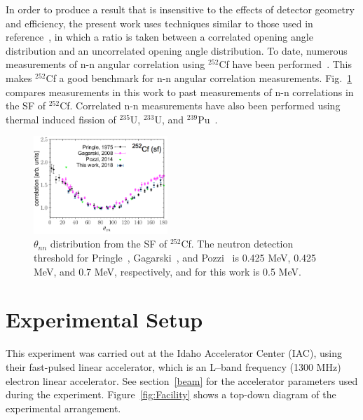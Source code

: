 \documentclass[%
 reprint,
 amsmath,amssymb,
 aps,
 nofootinbib
]{revtex4-1}
\begin{document}
In order to produce a result that is insensitive to the effects of detector geometry and efficiency, the present work uses techniques similar to those used in reference~\cite{1975Cf252}, in which a ratio is taken between a correlated opening angle distribution and an uncorrelated opening angle distribution.
To date, numerous measurements of n-n angular correlation using $^{252}$Cf have been performed~\cite{Verbeke2018, Pozzi2014, 2008CF252, 1975Cf252}.
This makes $^{252}$Cf a good benchmark for n-n angular correlation measurements.
Fig.~\ref{fig:Cf252_us_vs_them} compares measurements in this work to past measurements of n-n correlations in the SF of $^{252}$Cf.
Correlated n-n measurements have also been performed using thermal induced fission of $^{235}$U, $^{233}$U, and $^{239}$Pu~\cite{Sokolov2010}.
\begin{figure}[h]
\centering
\includegraphics[width=0.45\textwidth]{Cf252_us_vs_them.png}
\caption{$\theta_{nn}$ distribution from the SF of $^{252}$Cf.
 The neutron detection threshold for Pringle~\cite{1975Cf252}, Gagarski~\cite{2008CF252}, and Pozzi~\cite{Pozzi2016} is 0.425 MeV, 0.425 MeV, and 0.7 MeV, respectively, and for this work is 0.5 MeV.
}
\label{fig:Cf252_us_vs_them}
\end{figure}

\section{Experimental Setup}
This experiment was carried out at the Idaho Accelerator Center (IAC), using their fast-pulsed linear accelerator, which is an L--band frequency (1300 MHz) electron linear accelerator.
See section~\ref{beam} for the accelerator parameters used during the experiment.
Figure~\ref{fig:Facility} shows a top-down diagram of the experimental arrangement.
\end{document}
